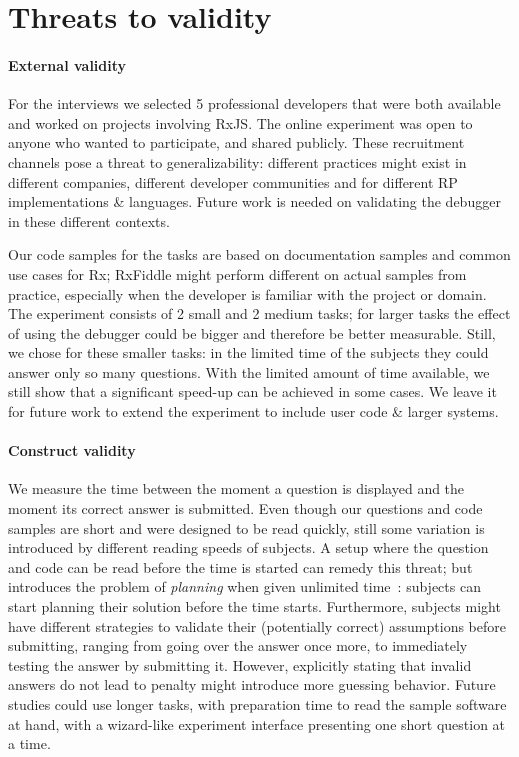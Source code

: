 \section{Threats to validity}
\paragraph{External validity} For the interviews we selected 5
professional developers that were both available and worked on projects
involving RxJS.  The online experiment was open to anyone who wanted to
participate, and shared publicly.  These recruitment channels pose a
threat to generalizability:  different practices might exist in
different companies, different developer communities and for different
RP implementations \& languages.  Future work is needed on validating
the debugger in these different contexts.

Our code samples for the tasks are based on documentation samples and
common use cases for Rx; RxFiddle might perform different on actual
samples from practice, especially when the developer is familiar with
the project or domain.  The experiment consists of 2 small and 2 medium
tasks; for larger tasks the effect of using the debugger could be bigger
and therefore be better measurable.  Still, we chose for these smaller
tasks:  in the limited time of the subjects they could answer only so
many questions.  With the limited amount of time available, we still
show that a significant speed-up can be achieved in some cases.  We
leave it for future work to extend the experiment to include user code
\& larger systems.

\paragraph{Construct validity} We measure the time between the moment a
question is displayed and the moment its correct answer is submitted.
Even though our questions and code samples are short and were designed
to be read quickly, still some variation is introduced by different
reading speeds of subjects.  A setup where the question and code can be
read before the time is started can remedy this threat; but introduces
the problem of \emph{planning} when given unlimited time~\cite{ko2015practical}:
subjects can start planning their solution before the time starts.
Furthermore, subjects might have different strategies to validate their
(potentially correct) assumptions before submitting, ranging from going
over the answer once more, to immediately testing the answer by
submitting it.  However, explicitly stating that invalid answers do not
lead to penalty might introduce more guessing behavior.  Future studies
could use longer tasks, with preparation time to read the sample
software at hand, with a wizard-like experiment interface presenting one
short question at a time.

